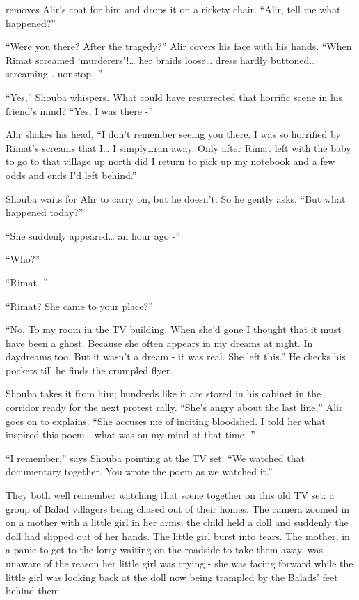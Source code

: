 \documentclass[twoside,11pt]{book}
\begin{document}
removes Alir's coat for him and drops it on a rickety chair. ``Alir, tell me what
happened?''

``Were you there? After the tragedy?'' Alir covers his face with his hands.
``When Rimat screamed `murderers'!{\ldots} her braids loose{\dots} dress hardly buttoned{\ldots} screaming{\dots}
nonstop -''

``Yes,'' Shouba whispers. What could have resurrected that horrific scene in his friend's
mind? ``Yes, I was there -''

Alir shakes his head, ``I don't remember seeing you there. I was so horrified by Rimat's
screams that I{\ldots} I simply{\dots}ran away. Only after Rimat left with the baby to go to that village up north did I
return to pick up my notebook and a few odds and ends I'd left behind.''

Shouba waits for Alir to carry on, but he doesn't. So he gently asks, ``But what happened
today?''

``She suddenly appeared{\dots} an hour ago -''

``Who?''

``Rimat -''

``Rimat? She came to your place?''

``No. To my room in the TV building. When she'd gone I thought that it must have been a ghost. Because she
often appears in my dreams at night. In daydreams too. But it wasn't a dream - it was real. She left
this.'' He checks his pockets till he finds the crumpled flyer.

Shouba takes it from him; hundreds like it are stored in his cabinet in the corridor ready for the next protest rally.
``She's angry about the last line,'' Alir goes on to explains. ``She accuses me
of inciting bloodshed. I told her what inspired this poem{\dots} what was on my mind at that time -''

``I remember,'' says Shouba pointing at the TV set. ``We watched that documentary
together. You wrote the poem as we watched it.''

 They both well remember watching that scene together on this old TV set: a group of Balad villagers being chased out
of their homes. The camera zoomed in on a mother with a little girl in her arms; the child held a doll and suddenly the
doll had slipped out of her hands. The little girl burst into tears. The mother, in a panic to get to the lorry waiting
on the roadside to take them away, was unaware of the reason her little girl was crying - she was facing forward while
the little girl was looking back at the doll now being trampled by the Balads' feet behind them.
\end{document}
